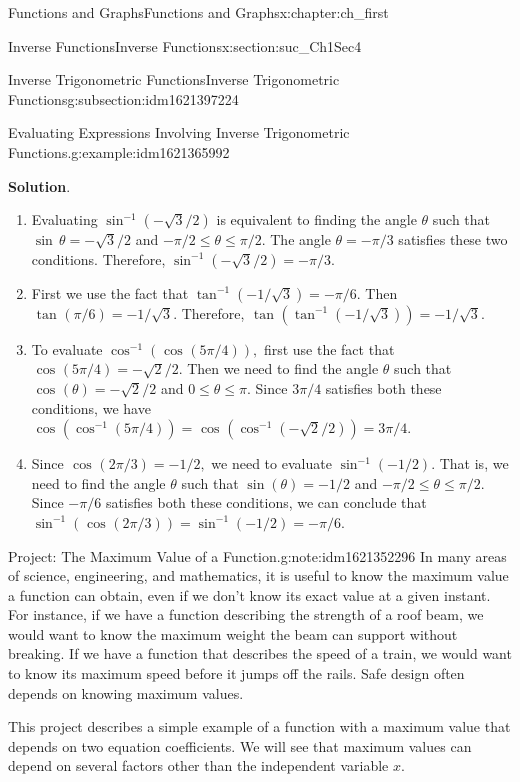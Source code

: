 \documentclass[oneside,10pt,]{book}
\newcommand{\blocktitlefont}{\relax}
\numberwithin{equation}{section}
\begin{document}
\begin{chapterptx}{Functions and Graphs}{}{Functions and Graphs}{}{}{x:chapter:ch_first}
\begin{sectionptx}{Inverse Functions}{}{Inverse Functions}{}{}{x:section:suc_Ch1Sec4}
\begin{subsectionptx}{Inverse Trigonometric Functions}{}{Inverse Trigonometric Functions}{}{}{g:subsection:idm1621397224}
\begin{example}{Evaluating Expressions Involving Inverse Trigonometric Functions.}{g:example:idm1621365992}
\begin{enumerate}
\end{enumerate}
\par\smallskip%
\noindent\textbf{\blocktitlefont Solution}.\hypertarget{g:solution:idm1621360616}{}\quad{}%
\begin{enumerate}
\item{}Evaluating \(\sin^{-1} (-\sqrt{3}/2)\) is equivalent to finding the angle \(\theta \) such that \(\sin\,\theta =-\sqrt{3}/2\) and \(-\pi/2\leq  \theta \leq  \pi/2.\) The angle \(\theta =-\pi/3\) satisfies these two conditions. Therefore, \(\sin^{-1} (-\sqrt{3}/2)=-\pi/3.\)%
\item{}First we use the fact that \(\tan^{-1} (-1/\sqrt{3})=-\pi/6.\) Then \(\text{ tan }(\pi/6)=-1/\sqrt{3}.\) Therefore, \(\text{ tan }(\tan^{-1} (-1/\sqrt{3}))=-1/\sqrt{3}.\)%
\item{}To evaluate \(\cos^{-1}(\text{ cos }(5\pi/4)),\) first use the fact that \(\text{ cos }(5\pi/4)=-\sqrt{2}/2.\) Then we need to find the angle \(\theta \) such that \(\text{ cos }(\theta )=-\sqrt{2}/2\) and \(0\leq  \theta \leq  \pi.\) Since \(3\pi/4\) satisfies both these conditions, we have \(\text{ cos }(\cos^{-1}(5\pi/4))=\text{ cos }(\cos^{-1}(-\sqrt{2}/2))=3\pi/4.\)%
\item{}Since \(\text{ cos }(2\pi/3)=-1/2,\) we need to evaluate \(\sin^{-1} (-1/2).\) That is, we need to find the angle \(\theta \) such that \(\sin(\theta )=-1/2\) and \(-\pi/2\leq  \theta \leq  \pi/2.\) Since \(-\pi/6\) satisfies both these conditions, we can conclude that \(\sin^{-1} (\text{ cos }(2\pi/3))=\sin^{-1} (-1/2)=-\pi/6.\)%
\end{enumerate}
\end{example}
\begin{note}{Project: The Maximum Value of a Function.}{g:note:idm1621352296}%
In many areas of science, engineering, and mathematics, it is useful to know the maximum value a function can obtain, even if we don’t know its exact value at a given instant. For instance, if we have a function describing the strength of a roof beam, we would want to know the maximum weight the beam can support without breaking. If we have a function that describes the speed of a train, we would want to know its maximum speed before it jumps off the rails. Safe design often depends on knowing maximum values.%
\par
This project describes a simple example of a function with a maximum value that depends on two equation coefficients. We will see that maximum values can depend on several factors other than the independent variable \(x\).%

\end{note}
\end{subsectionptx}
\end{sectionptx}
\end{chapterptx}
\end{document}
